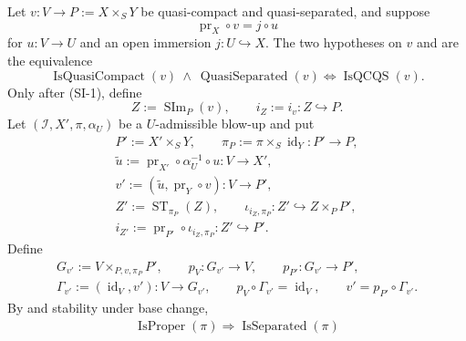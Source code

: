 \begin{lemma}
  \label{lemma:nagata-scheme-image-strict-transform}

  Let $v\colon V\to P:=X\times_SY$ be quasi-compact and
  quasi-separated, and suppose
  \[
    \operatorname{pr}_X\circ v=j\circ u
  \]
  for $u\colon V\to U$ and an open immersion $j\colon U\hookrightarrow X$.
  The two hypotheses on $v$ and
   are the equivalence
  \[
    \operatorname{IsQuasiCompact}(v)\ \wedge\
      \operatorname{QuasiSeparated}(v)
      \Longleftrightarrow \operatorname{IsQCQS}(v).               \tag{SI-1}
  \]
  Only after (SI-1), define
  \[
    Z:=\operatorname{SIm}_P(v),\qquad
    i_Z:=i_v\colon Z\hookrightarrow P.                            \tag{SI-0}
  \]
  Let $(\mathcal I,X',\pi,\alpha_U)$ be a $U$-admissible blow-up and put
  \[
  \begin{gathered}
    P':=X'\times_SY,\qquad
    \pi_P:=\pi\times_S\operatorname{id}_Y\colon P'\to P,\\
    \widetilde u:=
      \operatorname{pr}_{X'}\circ\alpha_U^{-1}\circ u\colon V\to X',\\
    v':=(\widetilde u,\operatorname{pr}_Y\circ v)\colon V\to P',\\
    Z':=\operatorname{ST}_{\pi_P}(Z),\qquad
    \iota_{i_Z,\pi_P}\colon Z'\hookrightarrow Z\times_PP',\\
    i_{Z'}:=\operatorname{pr}_{P'}\circ\iota_{i_Z,\pi_P}
      \colon Z'\hookrightarrow P'.
  \end{gathered}
  \]
  Define
  \[
  \begin{gathered}
    G_{v'}:=V\times_{P,v,\pi_P}P',\qquad
    p_V\colon G_{v'}\to V,\qquad p_{P'}\colon G_{v'}\to P',\\
    \Gamma_{v'}:=(\operatorname{id}_V,v')\colon V\to G_{v'},\qquad
    p_V\circ\Gamma_{v'}=\operatorname{id}_V,\qquad
    v'=p_{P'}\circ\Gamma_{v'}.
  \end{gathered}                                                   \tag{SI0}
  \]
  By  and stability under base change,
  \[
  \begin{gathered}
    \operatorname{IsProper}(\pi)
      \Longrightarrow \operatorname{IsSeparated}(\pi)

\end{gathered}\]
\end{lemma}
